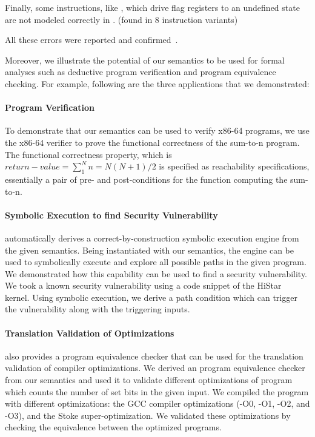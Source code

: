 Finally, some instructions, like , which drive flag registers to an undefined state are not modeled correctly in \Stoke.    (found in $8$ instruction variants)

All these errors were reported and confirmed~\cite{BugStoke983,BugStoke986}.

\vspace{4pt}
Moreover, we illustrate the potential of our semantics to be used for formal analyses such as deductive program verification and program equivalence checking. For example, following are the three applications that we demonstrated:

\paragraph{Program Verification} To demonstrate that our semantics can be used to verify
x86-64 programs, we use the x86-64 verifier to prove the
functional correctness of the sum-to-n program. The functional correctness
property, which is $return-value = \sum_1^N n = N (N + 1) / {2}$ is specified as reachability specifications, essentially a pair of pre- and post-conditions for the function computing the sum-to-n.

\paragraph{Symbolic Execution to find Security Vulnerability}
\K automatically derives a correct-by-construction symbolic execution engine from the given semantics.
Being instantiated with our semantics, the engine can be used to symbolically execute and explore all possible paths in the given \ISA program.
We demonstrated how this capability can be used to find a  security vulnerability. We took a known security vulnerability using a code snippet of the HiStar~\cite{HiStar:2006} kernel. Using symbolic execution, we derive a path condition which can trigger the  vulnerability along with the triggering inputs.

\paragraph{Translation Validation of Optimizations}
\K also provides a program equivalence checker that can be used for the translation validation of compiler optimizations.
We derived an \ISA program equivalence checker from our semantics and used it to validate different optimizations of  program which counts the number of set bits in the given input. We compiled the program with different optimizations: the GCC compiler optimizations (-O0, -O1, -O2, and -O3), and the Stoke super-optimization. We validated these optimizations by checking the equivalence between the optimized programs.


